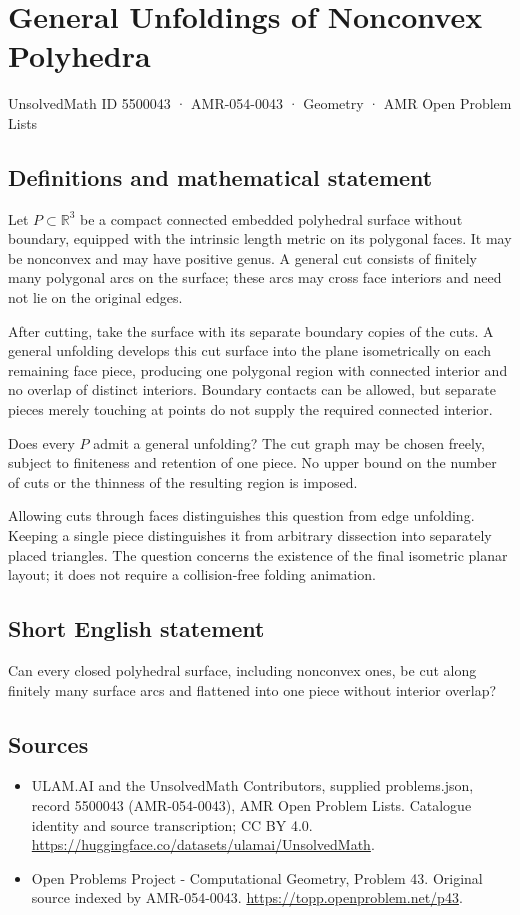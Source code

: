 \documentclass[11pt,a4paper]{article}
\begin{document}
\section*{General Unfoldings of Nonconvex Polyhedra}\label{5500043}
{\small UnsolvedMath ID 5500043 · AMR-054-0043 · Geometry · AMR Open Problem Lists}
\subsection{Definitions and mathematical statement}
Let $P\subset\mathbb R^3$ be a compact connected embedded polyhedral
surface without boundary, equipped with the intrinsic length metric
on its polygonal faces. It may be nonconvex and may have positive
genus. A general cut consists of finitely many polygonal arcs on
the surface; these arcs may cross face interiors and need not lie
on the original edges.

After cutting, take the surface with its separate boundary copies
of the cuts. A general unfolding develops this cut surface into
the plane isometrically on each remaining face piece, producing
one polygonal region with connected interior and no overlap of
distinct interiors. Boundary contacts can be allowed, but separate
pieces merely touching at points do not supply the required
connected interior.

Does every $P$ admit a general unfolding? The cut graph may be
chosen freely, subject to finiteness and retention of one piece.
No upper bound on the number of cuts or the thinness of the
resulting region is imposed.

Allowing cuts through faces distinguishes this question from edge
unfolding. Keeping a single piece distinguishes it from arbitrary
dissection into separately placed triangles. The question concerns
the existence of the final isometric planar layout; it does not
require a collision-free folding animation.
\subsection{Short English statement}
Can every closed polyhedral surface, including nonconvex ones, be
cut along finitely many surface arcs and flattened into one piece
without interior overlap?
\subsection{Sources}
\begin{itemize}
\item[S1] ULAM.AI and the UnsolvedMath Contributors, supplied problems.json, record 5500043 (AMR-054-0043), AMR Open Problem Lists. Catalogue identity and source transcription; CC BY 4.0.
\url{https://huggingface.co/datasets/ulamai/UnsolvedMath}.
\item[S2] Open Problems Project - Computational Geometry, Problem 43. Original source indexed by AMR-054-0043.
\url{https://topp.openproblem.net/p43}.
\end{itemize}
\end{document}
